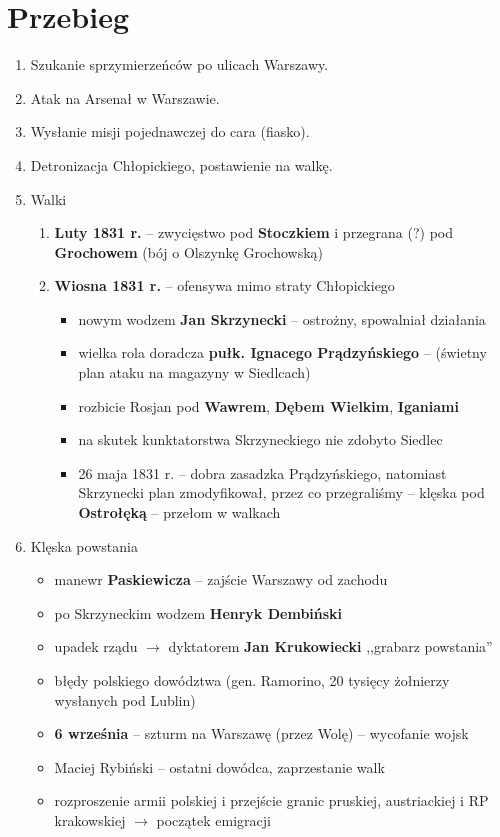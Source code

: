 \documentclass [a4paper, 11pt, oneside]{book}
\begin{document}
    \section{Przebieg} %
    \label{sec:przebieg}
        \begin{enumerate}
            \item Szukanie sprzymierzeńców po ulicach Warszawy.
            \item Atak na Arsenał w Warszawie.
            \item Wysłanie misji pojednawczej do cara (fiasko).
            \item Detronizacja Chłopickiego, postawienie na walkę.
            \item Walki
            \begin{enumerate}
                \item \textbf{Luty 1831 r.} -- zwycięstwo pod \textbf{Stoczkiem} i przegrana (?) pod \textbf{Grochowem} (bój o Olszynkę Grochowską)
                \item \textbf{Wiosna 1831 r.} -- ofensywa mimo straty Chłopickiego
                \begin{itemize}
                    \item nowym wodzem \textbf{Jan Skrzynecki} -- ostrożny, spowalniał działania
                    \item wielka rola doradcza \textbf{pułk. Ignacego Prądzyńskiego} -- (świetny plan ataku na magazyny w Siedlcach)
                    \item rozbicie Rosjan pod \textbf{Wawrem}, \textbf{Dębem Wielkim}, \textbf{Iganiami}
                    \item na skutek kunktatorstwa Skrzyneckiego nie zdobyto Siedlec
                    \item 26 maja 1831 r. -- dobra zasadzka Prądzyńskiego, natomiast Skrzynecki plan zmodyfikował, przez co przegraliśmy -- klęska pod \textbf{Ostrołęką} -- przełom w walkach
                \end{itemize}
            \end{enumerate}
            \item Klęska powstania
            \begin{itemize}
                \item manewr \textbf{Paskiewicza} -- zajście Warszawy od zachodu
                \item po Skrzyneckim wodzem \textbf{Henryk Dembiński}
                \item upadek rządu $\rightarrow$ dyktatorem \textbf{Jan Krukowiecki} ,,grabarz powstania''
                \item błędy polskiego dowództwa (gen. Ramorino, 20 tysięcy żołnierzy wysłanych pod Lublin)
                \item \textbf{6 września} -- szturm na Warszawę (przez Wolę) -- wycofanie wojsk
                \item Maciej Rybiński -- ostatni dowódca, zaprzestanie walk
                \item rozproszenie armii polskiej i przejście granic pruskiej, austriackiej i RP krakowskiej $\rightarrow$ początek emigracji
            \end{itemize}
        \end{enumerate}
\end{document}
